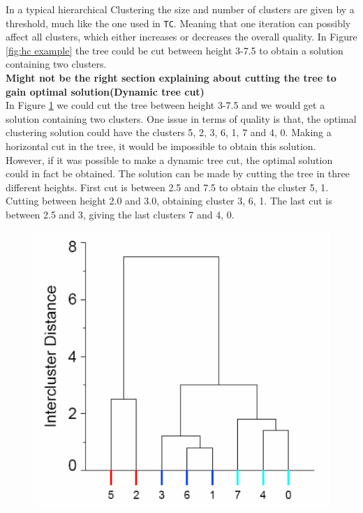 \documentclass[a4paper,10pt]{article}
\theoremstyle{plain}
\theoremstyle{definition}
\begin{document}
In a typical hierarchical Clustering the size and number of clusters are given by a threshold, much like the one used in \texttt{TC}. Meaning that one iteration can possibly affect all clusters, which either increases or decreases the overall quality. In Figure \ref{fig:hc example} the tree could be cut between height 3-7.5 to obtain a solution containing two clusters.
\\\textbf{Might not be the right section explaining about cutting the tree to gain optimal solution(Dynamic tree cut)}\\
In Figure \ref{fig:hc quality example} we could cut the tree between height 3-7.5 and we would get a solution containing two clusters. One issue in terms of quality is that, the optimal clustering solution could have the clusters {5, 2}, {3, 6, 1},  {7} and {4, 0}. Making a horizontal cut in the tree, it would be impossible to obtain this solution. However, if it was possible to make a dynamic tree cut, the optimal solution could in fact be obtained. The solution can be made by cutting the tree in three different heights. First cut is between 2.5 and 7.5 to obtain the cluster {5, 1}. Cutting between height 2.0 and 3.0, obtaining cluster {3, 6, 1}. The last cut is between 2.5 and 3, giving the last clusters {7} and {4, 0}.
\begin{figure}[H]
	\centering
	\includegraphics*[scale=0.4]{./pictures/hc/hc_quality_example.png}
	\caption{}
	\label{fig:hc quality example}
\end{figure}
\end{document}
